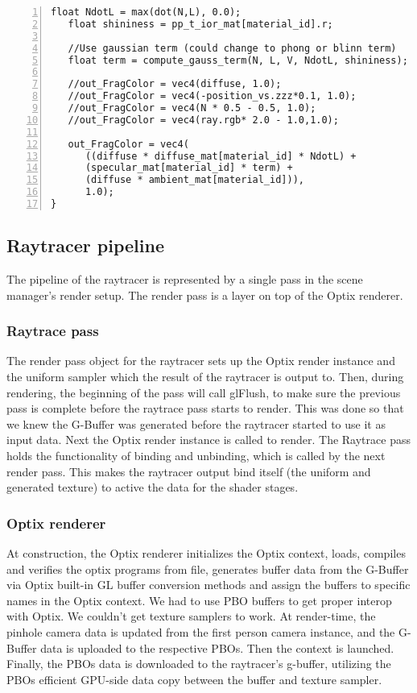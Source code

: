 \begin{Verbatim}[frame=single, numbers=left, label=Final fragment shader]
   float NdotL = max(dot(N,L), 0.0);
   float shininess = pp_t_ior_mat[material_id].r;
	
   //Use gaussian term (could change to phong or blinn term)
   float term = compute_gauss_term(N, L, V, NdotL, shininess);
    
   //out_FragColor = vec4(diffuse, 1.0);
   //out_FragColor = vec4(-position_vs.zzz*0.1, 1.0);
   //out_FragColor = vec4(N * 0.5 - 0.5, 1.0);
   //out_FragColor = vec4(ray.rgb* 2.0 - 1.0,1.0);
    
   out_FragColor = vec4( 
      ((diffuse * diffuse_mat[material_id] * NdotL) + 
      (specular_mat[material_id] * term) + 
      (diffuse * ambient_mat[material_id])), 
      1.0);
}
\end{Verbatim}

\subsection{Raytracer pipeline}
The pipeline of the raytracer is represented by a single pass in the scene manager's render setup. The render pass is a layer on top of the Optix renderer.

\subsubsection{Raytrace pass}
The render pass object for the raytracer sets up the Optix render instance and the uniform sampler which the result of the raytracer is output to.
Then, during rendering, the beginning of the pass will call glFlush, to make sure the previous pass is complete before the raytrace pass starts to render. This was done so that we knew the G-Buffer was generated before the raytracer started to use it as input data.
Next the Optix render instance is called to render.
The Raytrace pass holds the functionality of binding and unbinding, which is called by the next render pass. This makes the raytracer output bind itself (the uniform and generated texture) to active the data for the shader stages.

\subsubsection{Optix renderer}
At construction, the Optix renderer initializes the Optix context, loads, compiles and verifies the optix programs from file, generates buffer data from the G-Buffer via Optix built-in GL buffer conversion methods and assign the buffers to specific names in the Optix context. We had to use PBO buffers to get proper interop with Optix. We couldn't get texture samplers to work.
At render-time, the pinhole camera data is updated from the first person camera instance, and the G-Buffer data is uploaded to the respective PBOs. Then the context is launched. Finally, the PBOs data is downloaded to the raytracer's g-buffer, utilizing the PBOs efficient GPU-side data copy between the buffer and texture sampler.

